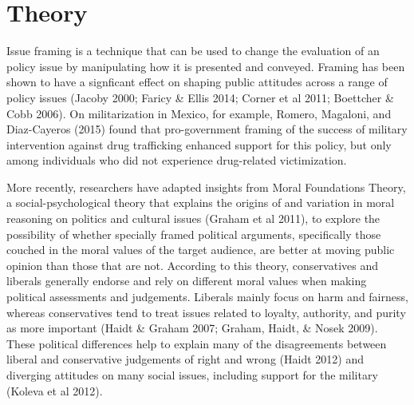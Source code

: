 \documentclass[
  12pt,
]{article}
\begin{document}
\hypertarget{theory}{%
\section{Theory}\label{theory}}

Issue framing is a technique that can be used to change the evaluation
of an policy issue by manipulating how it is presented and conveyed.
Framing has been shown to have a signficant effect on shaping public
attitudes across a range of policy issues (Jacoby 2000; Faricy \& Ellis
2014; Corner et al 2011; Boettcher \& Cobb 2006). On militarization in
Mexico, for example, Romero, Magaloni, and Diaz-Cayeros (2015) found
that pro-government framing of the success of military intervention
against drug trafficking enhanced support for this policy, but only
among individuals who did not experience drug-related victimization.

More recently, researchers have adapted insights from Moral Foundations
Theory, a social-psychological theory that explains the origins of and
variation in moral reasoning on politics and cultural issues (Graham et
al 2011), to explore the possibility of whether specially framed
political arguments, specifically those couched in the moral values of
the target audience, are better at moving public opinion than those that
are not. According to this theory, conservatives and liberals generally
endorse and rely on different moral values when making political
assessments and judgements. Liberals mainly focus on harm and fairness,
whereas conservatives tend to treat issues related to loyalty,
authority, and purity as more important (Haidt \& Graham 2007; Graham,
Haidt, \& Nosek 2009). These political differences help to explain many
of the disagreements between liberal and conservative judgements of
right and wrong (Haidt 2012) and diverging attitudes on many social
issues, including support for the military (Koleva et al 2012).
\end{document}
